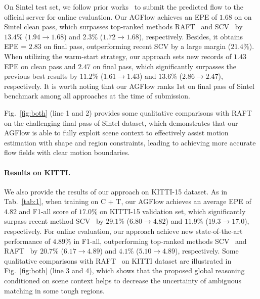 \documentclass[letterpaper]{article} %
\begin{document}
On Sintel test set, we follow prior works~\cite{Hui2018LiteFlowNetAL, Hur2019IterativeRR, Teed2020RAFTRA} to submit the predicted flow to the official server for online evaluation. Our AGFlow achieves an EPE of $1.68$ on on Sintel clean pass, which surpasses top-ranked methods RAFT~\cite{Teed2020RAFTRA} and SCV~\cite{Jiang2021LearningOF} by $13.4\%$ ($1.94 \rightarrow 1.68$) and $2.3\%$ ($1.72 \rightarrow 1.68$), respectively. Besides, it obtains EPE = $2.83$ on final pass, outperforming recent SCV by a large margin ($21.4\%$). When utilizing the warm-start strategy, our approach sets new records of $1.43$ EPE on clean pass and $2.47$ on final pass, which significantly surpasses the previous best results by $11.2\%$ ($1.61 \rightarrow 1.43$) and $13.6\%$ ($2.86 \rightarrow 2.47$), respectively. It is worth noting that our AGFlow ranks 1st on final pass of Sintel benchmark among all approaches at the time of submission. 

Fig.~\ref{fig:both} (line 1 and 2) provides some qualitative comparisons with RAFT~\cite{Teed2020RAFTRA} on the challenging final pass of Sintel dataset, which demonstrates that our AGFlow is able to fully exploit scene context to effectively assist motion estimation with shape and region constraints, leading to achieving more accurate flow fields with clear motion boundaries.

\paragraph{Results on KITTI.}

We also provide the results of our approach on KITTI-15 dataset. As in Tab.~\ref{tab:1}, when training on C + T, our AGFlow achieves an average EPE of $4.82$ and F1-all score of $17.0\% $ on KITTI-15 validation set, which significantly surpass recent method SCV~\cite{Jiang2021LearningOF} by $29.1\%$ ($6.80 \rightarrow 4.82$) and $11.9\%$ ($19.3 \rightarrow 17.0$), respectively. For online evaluation, our approach achieve new state-of-the-art performance of $4.89\%$ in F1-all, outperforming top-ranked methods SCV~\cite{Jiang2021LearningOF} and RAFT~\cite{Teed2020RAFTRA} by $20.7\%$ ($6.17\rightarrow 4.89$) and $4.1\%$ ($5.10 \rightarrow 4.89$), respectively. Some qualitative comparisons with RAFT~\cite{Teed2020RAFTRA} on KITTI dataset are illustrated in Fig.~\ref{fig:both} (line 3 and 4), which shows that the proposed global reasoning conditioned on scene context helps to decrease the uncertainty of ambiguous matching in some tough regions.
\end{document}
